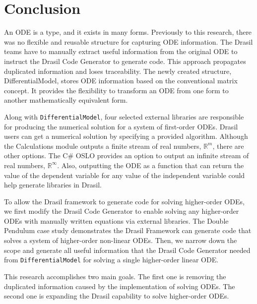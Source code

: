 \chapter{Conclusion}
An ODE is a type, and it exists in many forms. Previously to this research, there was no flexible and reusable structure for capturing ODE information. The Drasil teams have to manually extract useful information from the original ODE to instruct the Drasil Code Generator to generate code. This approach propagates duplicated information and loses traceability. The newly created structure, DifferentialModel, stores ODE information based on the conventional matrix concept. It provides the flexibility to transform an ODE from one form to another mathematically equivalent form.

Along with \verb|DifferentialModel|, four selected external libraries are responsible for producing the numerical solution for a system of first-order ODEs. Drasil users can get a numerical solution by specifying a provided algorithm. Although the Calculations module outputs a finite stream of real numbers, $\mathbb{R}^m$, there are other options. The C\# OSLO provides an option to output an infinite stream of real numbers, $\mathbb{R}^{\infty}$. Also, outputting the ODE as a function that can return the value of the dependent variable for any value of the independent variable could help generate libraries in Drasil.

To allow the Drasil framework to generate code for solving higher-order ODEs, we first modify the Drasil Code Generator to enable solving any higher-order ODEs with manually written equations via external libraries. The Double Pendulum case study demonstrates the Drasil Framework can generate code that solves a system of higher-order non-linear ODEs. Then, we narrow down the scope and generate all useful information that the Drasil Code Generator needed from \verb|DifferentialModel| for solving a single higher-order linear ODE.

This research accomplishes two main goals. The first one is removing the duplicated information caused by the implementation of solving ODEs. The second one is expanding the Drasil capability to solve higher-order ODEs.









